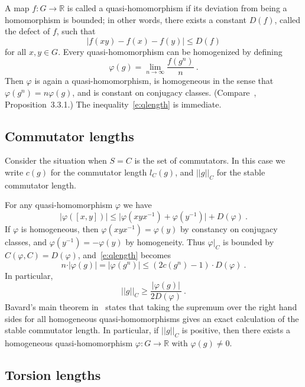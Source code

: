 \documentclass[12pt]{amsart}
\theoremstyle{remark}
\theoremstyle{definition}
\newcommand{\R}{\mathbb{ R}}
\begin{document}
A map $f\colon G\rightarrow\R$ is called a quasi-homomorphism 
if its deviation from being a homomorphism is bounded; in other words, 
there exists a constant $D(f)$, called the defect of $f$, 
such that
$$
\vert f(xy)-f(x)-f(y)\vert\leq D(f)
$$
for all $x,y\in G$. Every quasi-homomorphism can be homogenized by 
defining
$$
\varphi (g) = \lim_{n\rightarrow\infty}\frac{f(g^{n})}{n} \ .
$$
Then $\varphi$ is again a quasi-homomorphism, is homogeneous in the 
sense that $\varphi(g^{n})=n\varphi(g)$, and is constant on conjugacy 
classes. (Compare~\cite{B}, Proposition~3.3.1.) The 
inequality~\eqref{e:qlength} is immediate.

\subsection{Commutator lengths}

Consider the situation when $S=C$ is the set of commutators. 
In this case we write $c(g)$ for the commutator length $l_{C}(g)$, 
and $\vert\vert g\vert\vert_{C}$ for the stable commutator length.

For any quasi-homomorphism $\varphi$ we have
$$
\vert\varphi([x,y])\vert\leq\vert\varphi(xyx^{-1})+\varphi(y^{-1})\vert
+D(\varphi) \ .
$$
If $\varphi$ is homogeneous, then $\varphi(xyx^{-1})=\varphi(y)$ by 
constancy on conjugacy classes, and $\varphi(y^{-1})=-\varphi(y)$ by 
homogeneity. Thus $\varphi\vert_{C}$ is bounded by 
$C(\varphi,C)=D(\varphi)$, and~\eqref{e:qlength} becomes
\begin{equation}\label{e:commlength}
    n\cdot\vert\varphi(g)\vert = \vert\varphi(g^{n})\vert\leq 
    (2c(g^{n})-1)\cdot D(\varphi) \ .
    \end{equation}
In particular,
\begin{equation}\label{e:scommlength}
   \vert\vert g\vert\vert_{C}
    \geq\frac{\vert\varphi(g)\vert}{2D(\varphi)} \ .
    \end{equation}
Bavard's main theorem in~\cite{B} states that taking the supremum over the 
right hand sides for all homogeneous quasi-homomorphisms gives an 
exact calculation of the stable commutator length. In particular, if 
$\vert\vert g\vert\vert_{C}$ is positive, then there exists a 
homogeneous quasi-homomorphism $\varphi\colon G\rightarrow\R$ with 
$\varphi (g)\neq 0$.
    
\subsection{Torsion lengths}\label{ss:tor}
\end{document}

